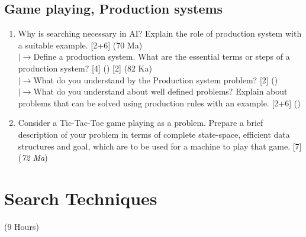 \documentclass[12pt]{article}
\newcommand{\lb}{\\$\left|\rightarrow\right.$}
\begin{document}
  \subsection{Game playing, Production systems}
    \begin{enumerate}[topsep=0pt, noitemsep]
      \item Why is searching necessary in AI? Explain the role of production system with a suitable example. \hfill [2+6] (70 Ma)
        \lb Define a production system. What are the essential terms or steps of a production system? \hfill [4] () [2] (82 Ka)
        \lb What do you understand by the Production system problem? \hfill [2] ()
        \lb What do you understand about well defined problems? Explain about problems that can be solved using production rules with an example. \hfill [2+6] ()

      \item Consider a Tic-Tac-Toe game playing as a problem. Prepare a brief description of your problem in terms of complete state-space, efficient data structures and goal, which are to be used for a machine to play that game. \hfill [7] (\textit{72 Ma})
    \end{enumerate}

\pagebreak
\section{Search Techniques}
\begin{center}(9 Hours)\end{center}
\end{document}
